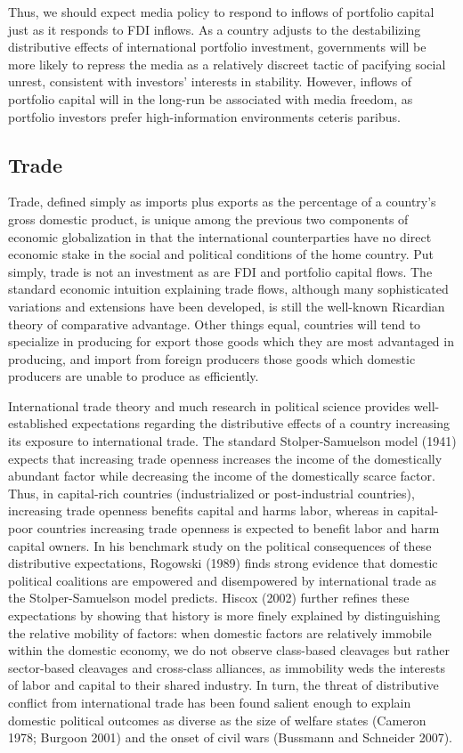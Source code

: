 \documentclass[a4paper]{article}\usepackage[]{graphicx}\usepackage[]{color}
\begin{document}
Thus, we should expect media policy to respond to inflows of portfolio capital just as it responds to FDI inflows. As a country adjusts to the destabilizing distributive effects of international portfolio investment, governments will be more likely to repress the media as a relatively discreet tactic of pacifying social unrest, consistent with investors' interests in stability. However, inflows of portfolio capital will in the long-run be associated with media freedom, as portfolio investors prefer high-information environments ceteris paribus.

\subsection{Trade}

Trade, defined simply as imports plus exports as the percentage of a country's gross domestic product, is unique among the previous two components of economic globalization in that the international counterparties have no direct economic stake in the social and political conditions of the home country. Put simply, trade is not an investment as are FDI and portfolio capital flows. The standard economic intuition explaining trade flows, although many sophisticated variations and extensions have been developed, is still the well-known Ricardian theory of comparative advantage. Other things equal, countries will tend to specialize in producing for export those goods which they are most advantaged in producing, and import from foreign producers those goods which domestic producers are unable to produce as efficiently.

International trade theory and much research in political science provides well-established expectations regarding the distributive effects of a country increasing its exposure to international trade. The standard Stolper-Samuelson model (1941) expects that increasing trade openness increases the income of the domestically abundant factor while decreasing the income of the domestically scarce factor. Thus, in capital-rich countries (industrialized or post-industrial countries), increasing trade openness benefits capital and harms labor, whereas in capital-poor countries increasing trade openness is expected to benefit labor and harm capital owners. In his benchmark study on the political consequences of these distributive expectations, Rogowski (1989) finds strong evidence that domestic political coalitions are empowered and disempowered by international trade as the Stolper-Samuelson model predicts. Hiscox (2002) further refines these expectations by showing that history is more finely explained by distinguishing the relative mobility of factors: when domestic factors are relatively immobile within the domestic economy, we do not observe class-based cleavages but rather sector-based cleavages and cross-class alliances, as immobility weds the interests of labor and capital to their shared industry. In turn, the threat of distributive conflict from international trade has been found salient enough to explain domestic political outcomes as diverse as the size of welfare states (Cameron 1978; Burgoon 2001) and the onset of civil wars (Bussmann and Schneider 2007).
\end{document}

